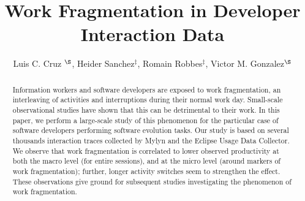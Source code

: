 \documentclass[times]{smrauth}
\begin{document}
%


\title{ Work Fragmentation in Developer Interaction Data}

\author{Luis C. Cruz $^{\S}$, Heider Sanchez$^{\ddagger}$, Romain Robbes$^{\ddagger}$, Victor M. Gonzalez$^{\S}$}

\address{$^{\ddagger}$: Computer Science Department (DCC), University of Chile, Chile;
$^{\S}$: Instituto Tecnologico Autonomo de Mexico, Mexico}


\maketitle





\begin{abstract}
Information workers and software developers are exposed to work fragmentation, an interleaving of activities and interruptions during their normal work day. Small-scale observational studies have shown that this can be detrimental to their work. In this paper, we perform a large-scale study of this phenomenon for the particular case of software developers performing software evolution tasks. Our study is based on several thousands interaction traces collected by Mylyn and the Eclipse Usage Data Collector. We observe that work fragmentation is correlated to lower observed productivity at both the macro level (for entire sessions), and at the micro level (around markers of work fragmentation); further, longer activity switches seem to strengthen the effect. These observations give ground for subsequent studies investigating the phenomenon of work fragmentation.
\end{abstract}


\end{document}
